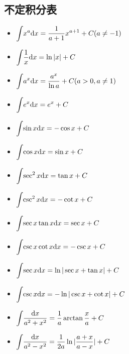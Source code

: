 \subsection{不定积分表}
\begin{multicols}{2}
    \begin{itemize}
        \item $ \displaystyle\int_{}\hspace{.2em} x^{a}\mathrm{d}x=\frac{1}{a+1}x^{a+1}+C(a\neq -1) $
        \item $ \displaystyle\int_{}\hspace{.2em} \frac{1}{x}\mathrm{d}x=\ln |x|+C $
        \item $ \displaystyle\int_{}\hspace{.2em} a^{x}\mathrm{d}x=\frac{a^{x}}{\ln a}+C(a>0, a\neq 1) $
        \item $ \displaystyle\int_{}\hspace{.2em}e^{x}\mathrm{d}x=e^{x}+C $
        \item $ \displaystyle\int_{}\hspace{.2em}\sin x \mathrm{d}x=-\cos x+C $
        \item $ \displaystyle\int_{}\hspace{.2em}\cos x \mathrm{d}x=\sin x+C $
        \item $ \displaystyle\int_{}\hspace{.2em}\sec^{2}x \mathrm{d}x=\tan x+C $
        \item $ \displaystyle\int_{}\hspace{.2em}\csc^{2}x \mathrm{d}x=-\cot x+C $
        \item $ \displaystyle\int_{}\hspace{.2em}\sec x\tan x \mathrm{d}x=\sec x+C $
        \item $ \displaystyle\int_{}\hspace{.2em}\csc x\cot x \mathrm{d}x=-\csc x+C $
        \item $ \displaystyle\int_{}\hspace{.2em}\sec x \mathrm{d}x=\ln |\sec x+\tan x|+C $
        \item $ \displaystyle\int_{}\hspace{.2em}\csc x \mathrm{d}x=-\ln|\csc x+\cot x|+C $
        \item $ \displaystyle\int_{}\hspace{.2em}\frac{\mathrm{d}x}{a^{2}+x^{2}}=\frac{1}{a}\arctan \frac{x}{a}+C $
        \item $ \displaystyle\int_{}\hspace{.2em}\frac{\mathrm{d}x}{a^{2}-x^{2}}=\frac{1}{2a}\ln |\frac{a+x}{a-x}|+C $

\end{itemize}
\end{multicols}
